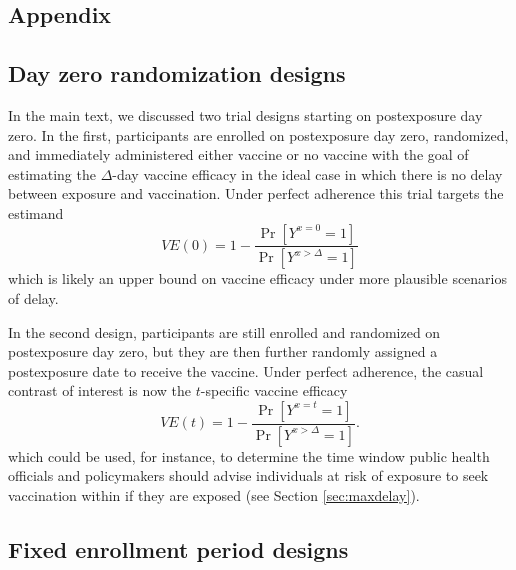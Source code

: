 \begin{appendix}

    \renewcommand{\thefigure}{A\arabic{figure}}
    \setcounter{figure}{0}
    
    \renewcommand{\thetable}{A\arabic{table}}
    \setcounter{table}{0}
    
    \renewcommand{\theequation}{A\arabic{equation}}
    \setcounter{equation}{0}

    \newpage

    \section{Appendix}

    \subsection{Day zero randomization designs} \label{sec:dayzero}
    In the main text, we discussed two trial designs starting on postexposure day zero. In the first, participants are enrolled on postexposure day zero, randomized, and immediately administered either vaccine or no vaccine with the goal of estimating the $\Delta$-day vaccine efficacy in the ideal case in which there is no delay between exposure and vaccination. Under perfect adherence this trial targets the estimand
    $$VE(0) = 1 - \frac{\Pr[Y^{x = 0} = 1]}{\Pr[Y^{x > \Delta} = 1]}$$
    which is likely an upper bound on vaccine efficacy under more plausible scenarios of delay. 

    In the second design, participants are still enrolled and randomized on postexposure day zero, but they are then further randomly assigned a postexposure date to receive the vaccine.  Under perfect adherence, the casual contrast of interest is now the $t$-specific vaccine efficacy
    $$VE(t) = 1 - \frac{\Pr[Y^{x = t} = 1]}{\Pr[Y^{x > \Delta} = 1]}.$$
    which could be used, for instance, to determine the time window public health officials and policymakers should advise individuals at risk of exposure to seek vaccination within if they are exposed (see Section \ref{sec:maxdelay}).

    \subsection{Fixed enrollment period designs} \label{sec:enrollment}


\end{appendix}
